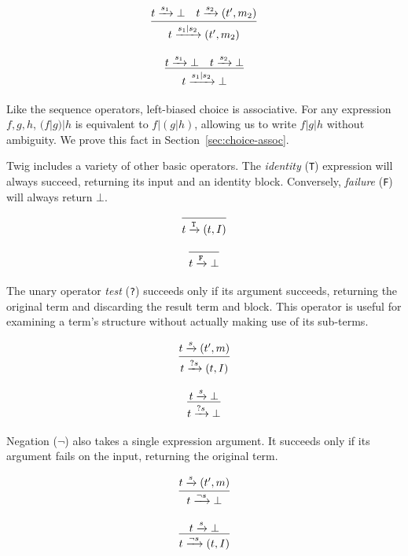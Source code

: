 \begin{equation}
\label{C2}
\infer
  {t \arr{s_1|s_2} (t',m_2)}
  {t \arr{s_1} \bot \quad t \arr{s_2} (t',m_2)}
\end{equation}

\begin{equation}
\label{C3}
\infer
  {t \arr{s_1|s_2} \bot}
  {t \arr{s_1} \bot \quad t \arr{s_2} \bot}
\end{equation}

Like the sequence operators, left-biased choice is associative.
For any expression $f,g,h$, $(f|g)|h$ is equivalent to $f|(g|h)$,
allowing us to write $f|g|h$ without ambiguity. We prove this fact
in Section~\ref{sec:choice-assoc}.

Twig includes a variety of other basic operators. The
\emph{identity} (\texttt{T}) expression will always succeed,
returning its input and an identity block. Conversely,
\emph{failure} (\texttt{F}) will always return \texttt{$\bot$}.

\begin{equation}
\label{SUCC}
\infer
  {t \arr{\mathtt{T}} (t,I)}
  {}  
\end{equation}

\begin{equation}
\label{FAIL}
\infer
  {t \arr{\mathtt{F}} \bot}
  {}  
\end{equation}

The unary operator \emph{test} (\texttt{?}) succeeds only if its
argument succeeds, returning the original term and discarding the
result term and block. This operator is useful for examining a
term's structure without actually making use of its sub-terms.

\begin{equation}
\infer
  {t \arr{?s} (t,I)}
  {t \arr{s} (t',m)}
\end{equation}

\begin{equation}
\infer
  {t \arr{?s} \bot}
  {t \arr{s} \bot}  
\end{equation}

Negation (\texttt{$\lnot$}) also takes a single expression
argument. It succeeds only if its argument fails on the input,
returning the original term.

\begin{equation}
\infer
  {t \arr{\lnot s} \bot}
  {t \arr{s} (t',m)}  
\end{equation}

\begin{equation}
\infer
  {t \arr{\lnot s} (t,I)}
  {t \arr{s} \bot}  
\end{equation}

